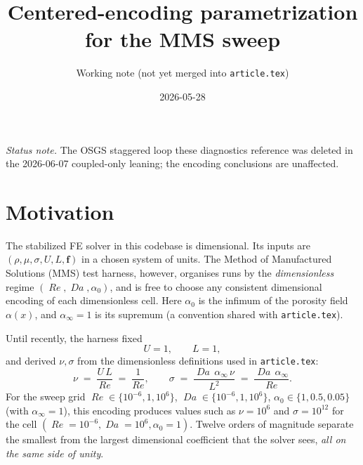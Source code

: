 \documentclass[11pt]{article}
\title{Centered-encoding parametrization for the MMS sweep}
\author{Working note (not yet merged into \texttt{article.tex})}
\date{2026-05-28}
\newcommand{\Reyn}{\operatorname{\mathit{Re}}}
\newcommand{\Damk}{\operatorname{\mathit{Da}}}
\begin{document}
\maketitle

\noindent\emph{Status note.} The OSGS staggered loop these diagnostics
reference was deleted in the 2026-06-07 coupled-only leaning; the encoding
conclusions are unaffected.

\section{Motivation}

The stabilized FE solver in this codebase is dimensional. Its inputs are
$(\rho, \mu, \sigma, U, L, \boldsymbol{f})$ in a chosen system of units.
The Method of Manufactured Solutions (MMS) test harness, however, organises
runs by the \emph{dimensionless} regime $(\Reyn, \Damk, \alpha_0)$, and is
free to choose any consistent dimensional encoding of each dimensionless
cell. Here $\alpha_0$ is the infimum of the porosity field $\alpha(x)$, and
$\alpha_\infty = 1$ is its supremum (a convention shared with
\texttt{article.tex}).

Until recently, the harness fixed
\begin{equation}
  U = 1, \qquad L = 1,
\end{equation}
and derived $\nu, \sigma$ from the dimensionless definitions used in
\texttt{article.tex}:
\begin{equation}
  \nu \;=\; \frac{U\,L}{\Reyn} \;=\; \frac{1}{\Reyn},
  \qquad
  \sigma \;=\; \frac{\Damk\,\alpha_\infty\,\nu}{L^2}
                          \;=\; \frac{\Damk\,\alpha_\infty}{\Reyn}.
\end{equation}
For the sweep grid $\Reyn \in \{10^{-6}, 1, 10^{6}\}$,
$\Damk \in \{10^{-6}, 1, 10^{6}\}$, $\alpha_0 \in \{1, 0.5, 0.05\}$
(with $\alpha_\infty = 1$), this encoding produces values such as
$\nu = 10^{6}$ and $\sigma = 10^{12}$ for the cell
$(\Reyn=10^{-6}, \Damk=10^{6}, \alpha_0=1)$. Twelve orders of magnitude
separate the smallest from the largest dimensional coefficient that the
solver sees, \emph{all on the same side of unity}.
\end{document}
